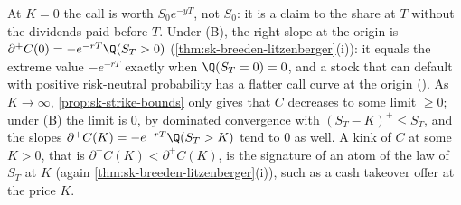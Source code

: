 \begin{remark}\label{rem:sk-edges}
At $K=0$ the call is worth $S_0e^{-yT}$, not $S_0$: it is a claim to the share at $T$ without the
dividends paid before $T$. Under (B), the right slope at the origin is
$\partial^+C(0)=-e^{-rT}\Q(S_T>0)$ (\cref{thm:sk-breeden-litzenberger}(i)): it equals the extreme value
$-e^{-rT}$ exactly when $\Q(S_T=0)=0$, and a stock that can default with positive risk-neutral
probability has a flatter call curve at the origin (). As $K\to\infty$,
\cref{prop:sk-strike-bounds} only gives that $C$ decreases to some limit $\ge0$; under (B) the limit
is $0$, by dominated convergence with $(S_T-K)^+\le S_T$, and the slopes
$\partial^+C(K)=-e^{-rT}\Q(S_T>K)$ tend to $0$ as well. A kink of $C$ at some $K>0$, that is
$\partial^-C(K)<\partial^+C(K)$, is the signature of an atom of the law of $S_T$ at $K$ (again
\cref{thm:sk-breeden-litzenberger}(i)), such as a cash takeover offer at the price $K$.
\end{remark}

